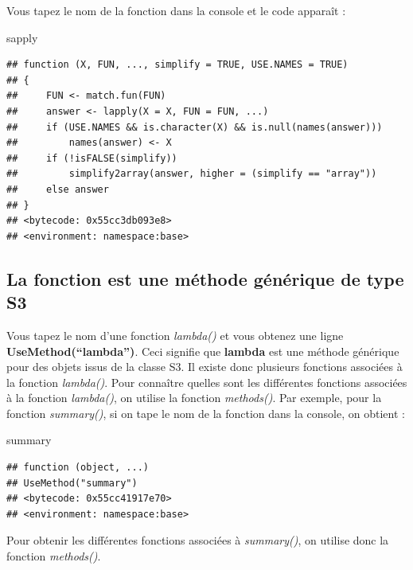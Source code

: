 \documentclass[
]{book}
\newenvironment{Shaded}{\begin{snugshade}}{\end{snugshade}}
\newcommand{\NormalTok}[1]{#1}
\theoremstyle{definition}
\theoremstyle{definition}
\theoremstyle{definition}
\theoremstyle{definition}
\theoremstyle{remark}
\begin{document}
Vous tapez le nom de la fonction dans la console et le code apparaît :

\begin{Shaded}
\begin{Highlighting}[]
\NormalTok{sapply}
\end{Highlighting}
\end{Shaded}

\begin{verbatim}
## function (X, FUN, ..., simplify = TRUE, USE.NAMES = TRUE) 
## {
##     FUN <- match.fun(FUN)
##     answer <- lapply(X = X, FUN = FUN, ...)
##     if (USE.NAMES && is.character(X) && is.null(names(answer))) 
##         names(answer) <- X
##     if (!isFALSE(simplify)) 
##         simplify2array(answer, higher = (simplify == "array"))
##     else answer
## }
## <bytecode: 0x55cc3db093e8>
## <environment: namespace:base>
\end{verbatim}

\hypertarget{la-fonction-est-une-muxe9thode-guxe9nuxe9rique-de-type-s3}{%
\subsection{La fonction est une méthode générique de type S3}\label{la-fonction-est-une-muxe9thode-guxe9nuxe9rique-de-type-s3}}

Vous tapez le nom d'une fonction \emph{lambda()} et vous obtenez une ligne \textbf{UseMethod(``lambda'')}. Ceci signifie que \textbf{lambda} est une méthode générique pour des objets issus de la classe S3. Il existe donc plusieurs fonctions associées à la fonction \emph{lambda()}. Pour connaître quelles sont les différentes fonctions associées à la fonction \emph{lambda()}, on utilise la fonction \emph{methods()}. Par exemple, pour la fonction \emph{summary()}, si on tape le nom de la fonction dans la console, on obtient :

\begin{Shaded}
\begin{Highlighting}[]
\NormalTok{summary}
\end{Highlighting}
\end{Shaded}

\begin{verbatim}
## function (object, ...) 
## UseMethod("summary")
## <bytecode: 0x55cc41917e70>
## <environment: namespace:base>
\end{verbatim}

Pour obtenir les différentes fonctions associées à \emph{summary()}, on utilise donc la fonction \emph{methods()}.
\end{document}
